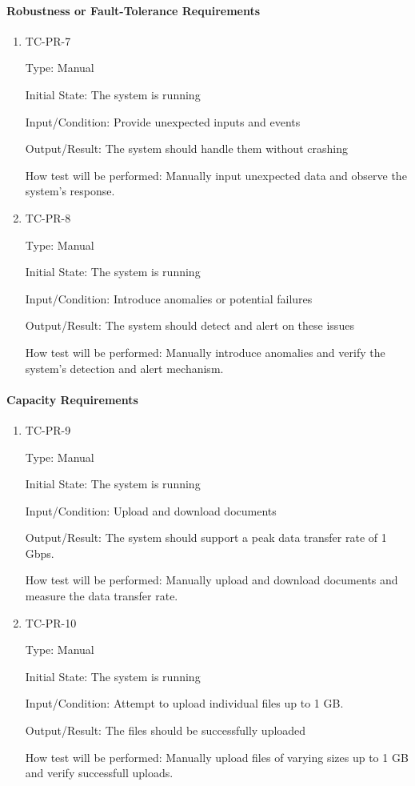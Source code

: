 \documentclass[12pt, titlepage]{article}
\begin{document}
\paragraph{Robustness or Fault-Tolerance Requirements}
\begin{enumerate}

  \item {TC-PR-7\\}

    Type: Manual

    Initial State: The system is running

    Input/Condition: Provide unexpected inputs and events

    Output/Result: The system should handle them without crashing

    How test will be performed: Manually input unexpected data and observe the
    system's response.

    \item {TC-PR-8\\}

    Type: Manual

    Initial State: The system is running

    Input/Condition: Introduce anomalies or potential failures

    Output/Result: The system should detect and alert on these issues

    How test will be performed: Manually introduce anomalies and verify the
    system's detection and alert mechanism.

\end{enumerate}

\paragraph{Capacity Requirements}
\begin{enumerate}

  \item {TC-PR-9\\}

    Type: Manual

    Initial State: The system is running

    Input/Condition: Upload and download documents

    Output/Result: The system should support a peak data transfer rate of 1 
    Gbps.

    How test will be performed: Manually upload and download documents and
    measure the data transfer rate.

    \item {TC-PR-10\\}

    Type: Manual

    Initial State: The system is running

    Input/Condition: Attempt to upload individual files up to 1 GB.

    Output/Result: The files should be successfully uploaded

    How test will be performed: Manually upload files of varying sizes up to
    1 GB and verify successfull uploads.


\end{enumerate}
\end{document}
